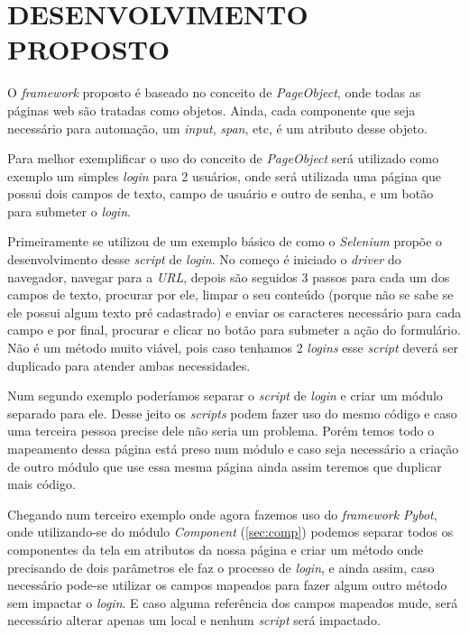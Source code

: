 %
%

\chapter{DESENVOLVIMENTO PROPOSTO}\label{chap:proj}
    O \textit{framework} proposto é baseado no conceito de \textit{PageObject}, onde todas as páginas web são tratadas como objetos.
    Ainda, cada componente que seja necessário para automação, um \textit{input}, \textit{span}, etc, é um atributo desse objeto.

    Para melhor exemplificar o uso do conceito de \textit{PageObject} será utilizado como exemplo um simples \textit{login} para 2
    usuários, onde será utilizada uma página que possui dois campos de texto, campo de usuário e outro de senha,
    e um botão para submeter o \textit{login}.

    Primeiramente se utilizou de um exemplo básico de como o \textit{Selenium} propõe o desenvolvimento desse \textit{script} de
    \textit{login}. No começo é iniciado o \textit{driver} do navegador, navegar para a \textit{URL}, depois
    são seguidos 3 passos para cada um dos campos de texto, procurar por ele, limpar o seu conteúdo
    (porque não se sabe se ele possui algum texto pré cadastrado) e enviar os caracteres necessário para
    cada campo e por final, procurar e clicar no botão para submeter a ação do formulário. Não é um método muito viável,
    pois caso tenhamos 2 \textit{logins} esse \textit{script} deverá ser duplicado para atender ambas necessidades.

    Num segundo exemplo poderíamos separar o \textit{script} de \textit{login} e criar um módulo separado para ele. Desse jeito
    os \textit{scripts} podem fazer uso do mesmo código e caso uma terceira pessoa precise dele não seria um problema.
    Porém temos todo o mapeamento dessa página está preso num módulo e caso seja necessário a criação de outro
    módulo que use essa mesma página ainda assim teremos que duplicar mais código.

    Chegando num terceiro exemplo onde agora fazemos uso do \textit{framework} \textit{Pybot}, onde utilizando-se do
    módulo \textit{Component} (\autoref{sec:comp}) podemos separar todos os componentes da tela em atributos da nossa página
    e criar um método onde precisando de dois parâmetros ele faz o processo de \textit{login}, e ainda assim, caso
    necessário pode-se utilizar os campos mapeados para fazer algum outro método sem impactar o \textit{login}.
    E caso alguma referência dos campos mapeados mude, será necessário alterar apenas um local e nenhum \textit{script}
    será impactado.


